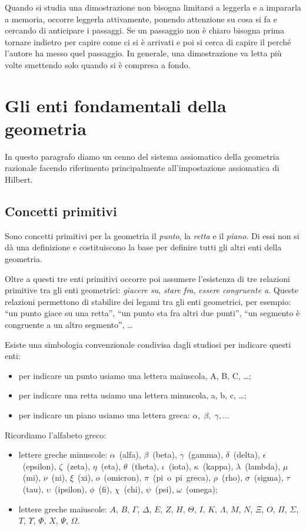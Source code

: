 {Quando si studia una dimostrazione non bisogna limitarsi a leggerla e a impararla a memoria, occorre leggerla attivamente, ponendo attenzione su cosa si fa e cercando di anticipare i passaggi. Se un passaggio non è chiaro bisogna prima tornare indietro per capire come ci si è arrivati e poi si cerca di capire il perché l'autore ha messo quel passaggio. In generale, una dimostrazione va letta più volte smettendo solo quando si è compresa a fondo.

\section{Gli enti fondamentali della geometria}
In questo paragrafo diamo un cenno del sistema assiomatico della geometria razionale facendo riferimento principalmente all'impostazione assiomatica di Hilbert.

\subsection{Concetti primitivi}

Sono concetti primitivi per la geometria il \emph{punto}, la \emph{retta} e il \emph{piano}. Di essi non si dà una definizione e costituiscono la base per definire tutti gli altri enti della geometria.

Oltre a questi tre enti primitivi occorre poi assumere l'esistenza di tre relazioni primitive tra gli enti geometrici: \emph{giacere su}, \emph{stare fra}, \emph{essere congruente a}. Queste relazioni permettono di stabilire dei legami tra gli enti geometrici, per esempio: “un punto giace su una retta”, “un punto sta fra altri due punti”, “un segmento è congruente a un altro segmento”, \ldots

Esiste una simbologia convenzionale condivisa dagli studiosi per indicare questi enti:
\begin{itemize}
\item per indicare un punto usiamo una lettera maiuscola, A, B, C, \ldots;
\item per indicare una retta usiamo una lettera minuscola, a, b, c, \ldots;
\item per indicare un piano usiamo una lettera greca:  $\alpha ,\;\beta ,\;\gamma ,\ldots $
\end{itemize}

Ricordiamo l'alfabeto greco:
\begin{itemize}
\item lettere greche minuscole:  $\alpha$~(alfa),  $\beta$~(beta),  $\gamma$~(gamma),  $\delta$~(delta), $\epsilon$~(epsilon), $\zeta$~(zeta), $\eta$~(eta), $\theta$~(theta),  $\iota$~(iota),  $\kappa$~(kappa), $\lambda$~(lambda), $\mu$~(mi), $\nu$~(ni),  $\xi$~(xi), $o$~(omicron), $\pi$~(pi~o~pi~greca), $\rho$~(rho), $\sigma$~(sigma), $\tau$~(tau), $\upsilon$~(ipsilon), $\phi$~(fi), $\chi$~(chi), $\psi$~(psi), $\omega$~(omega);
\item lettere greche maiuscole:  $A$, $B$, $ \Gamma $, $ \Delta $, $ E $, $ Z $, $ H $, $ \Theta $, $ I $, $ K $, $ \Lambda $, $ M $, $ N $, $ \Xi $, $ O $, $ \Pi $, $ \Sigma $, $ T $, $ \Upsilon $, $ \Phi $, $ X $, $ \Psi $, $\Omega $.
\end{itemize}

}
